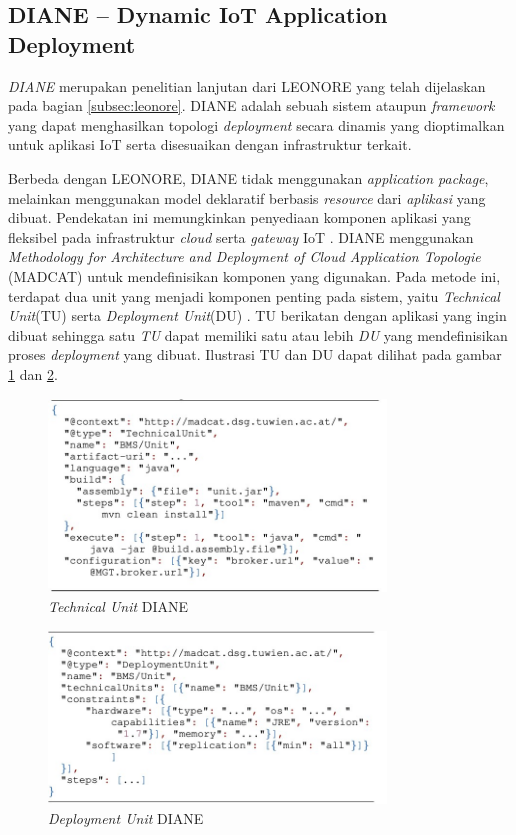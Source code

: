 \subsection{DIANE – Dynamic IoT Application Deployment}
\textit{DIANE} merupakan penelitian lanjutan dari LEONORE yang telah dijelaskan pada bagian \ref{subsec:leonore}. DIANE adalah sebuah sistem ataupun \textit{framework} yang dapat menghasilkan topologi \textit{deployment} secara dinamis yang dioptimalkan untuk aplikasi IoT serta disesuaikan dengan infrastruktur terkait.

Berbeda dengan LEONORE, DIANE tidak menggunakan \textit{application package}, melainkan menggunakan model deklaratif berbasis \textit{resource} dari \textit{aplikasi} yang dibuat. Pendekatan ini memungkinkan penyediaan komponen aplikasi yang fleksibel pada infrastruktur \textit{cloud} serta \textit{gateway} IoT \parencite{vogler2015diane}. DIANE menggunakan \textit{Methodology for Architecture and Deployment of Cloud Application Topologie} (MADCAT) untuk mendefinisikan komponen yang digunakan. Pada metode ini, terdapat dua unit yang menjadi komponen penting pada sistem, yaitu \textit{Technical Unit}(TU) serta \textit{Deployment Unit}(DU) \parencite{madcat}. TU berikatan dengan aplikasi yang ingin dibuat sehingga satu \textit{TU} dapat memiliki satu atau lebih \textit{DU} yang mendefinisikan proses \textit{deployment} yang dibuat. Ilustrasi TU dan DU dapat dilihat pada gambar \ref{fig:diane-tu} dan \ref{fig:diane-du}.

\begin{figure}[ht]
  \centering
  \includegraphics[width=0.8\textwidth]{resources/chapter-2/diane-technical-unit.jpg}
  \caption{\textit{Technical Unit} DIANE \parencite{vogler2015diane}}
  \label{fig:diane-tu}
\end{figure}

\begin{figure}[ht]
  \centering
  \includegraphics[width=0.8\textwidth]{resources/chapter-2/diane-deployment-unit.jpg}
  \caption{\textit{Deployment Unit} DIANE \parencite{vogler2015diane}}
  \label{fig:diane-du}
\end{figure}

